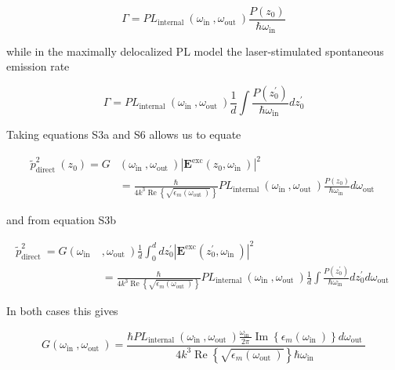 \documentclass[10pt]{article}
\begin{document}
$$
\Gamma=P L_{\text {internal }}\left(\omega_{\text {in }}, \omega_{\text {out }}\right) \frac{P\left(z_{0}\right)}{\hbar \omega_{\text {in }}}
$$

while in the maximally delocalized PL model the laser-stimulated spontaneous emission rate

$$
\Gamma=P L_{\text {internal }}\left(\omega_{\text {in }}, \omega_{\text {out }}\right) \frac{1}{d} \int \frac{P\left(z_{0}^{\prime}\right)}{\hbar \omega_{\text {in }}} d z_{0}^{\prime}
$$

Taking equations S3a and S6 allows us to equate

$$
\begin{aligned}
\tilde{p}_{\text {direct }}^{2}\left(z_{0}\right)=G & \left(\omega_{\text {in }}, \omega_{\text {out }}\right)\left|\mathbf{E}^{\operatorname{exc}}\left(z_{0}, \omega_{\text {in }}\right)\right|^{2} \\
& =\frac{\hbar}{4 k^{3} \operatorname{Re}\left\{\sqrt{\epsilon_{m}\left(\omega_{\text {out }}\right)}\right\}} P L_{\text {internal }}\left(\omega_{\text {in }}, \omega_{\text {out }}\right) \frac{P\left(z_{0}\right)}{\hbar \omega_{\text {in }}} d \omega_{\text {out }}
\end{aligned}
$$

and from equation S3b

$$
\begin{aligned}
\tilde{p}_{\text {direct }}^{2}=G\left(\omega_{\text {in }}\right. & \left., \omega_{\text {out }}\right) \frac{1}{d} \int_{0}^{d} d z_{0}^{\prime}\left|\mathbf{E}^{\operatorname{exc}}\left(z_{0}^{\prime}, \omega_{\text {in }}\right)\right|^{2} \\
& =\frac{\hbar}{4 k^{3} \operatorname{Re}\left\{\sqrt{\epsilon_{m}\left(\omega_{\text {out }}\right)}\right\}} P L_{\text {internal }}\left(\omega_{\text {in }}, \omega_{\text {out }}\right) \frac{1}{d} \int \frac{P\left(z_{0}^{\prime}\right)}{\hbar \omega_{\text {in }}} d z_{0}^{\prime} d \omega_{\text {out }}
\end{aligned}
$$

In both cases this gives

$$
G\left(\omega_{\text {in }}, \omega_{\text {out }}\right)=\frac{\hbar P L_{\text {internal }}\left(\omega_{\text {in }}, \omega_{\text {out }}\right) \frac{\omega_{\text {in }}}{2 \pi} \operatorname{Im}\left\{\epsilon_{m}\left(\omega_{\text {in }}\right)\right\} d \omega_{\text {out }}}{4 k^{3} \operatorname{Re}\left\{\sqrt{\epsilon_{m}\left(\omega_{\text {out }}\right)}\right\} \hbar \omega_{\text {in }}}
$$
\end{document}
